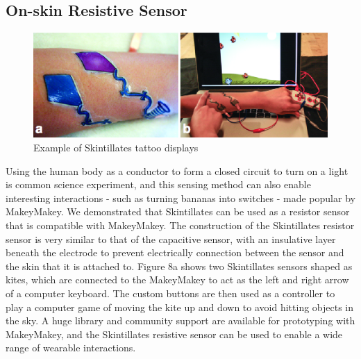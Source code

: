 \documentclass{sigchi}
\begin{document}

\subsection {On-skin Resistive Sensor}
\begin{figure}
\centering
\includegraphics[width=1\columnwidth]{figures/Figure9}
\caption{Example of Skintillates tattoo displays}
\vspace{-8pt}
\label{fig:figure8}
\end{figure}
Using the human body as a conductor to form a closed circuit to turn on a light is common science experiment, and this sensing method can also enable interesting interactions - such as turning bananas into switches - made popular by MakeyMakey. We demonstrated that Skintillates can be used as a resistor sensor that is compatible with MakeyMakey. The construction of the Skintillates resistor sensor is very similar to that of the capacitive sensor, with an insulative layer beneath the electrode to prevent electrically connection between the sensor and the skin that it is attached to. Figure 8a shows two Skintillates sensors shaped as kites, which are connected to the MakeyMakey to act as the left and right arrow of a computer keyboard. The custom buttons are then used as a controller to play a computer game of moving the kite up and down to avoid hitting objects in the sky. A huge library and community support are available for prototyping with MakeyMakey, and the Skintillates resistive sensor can be used to enable a wide range of wearable interactions. 
\end{document}

